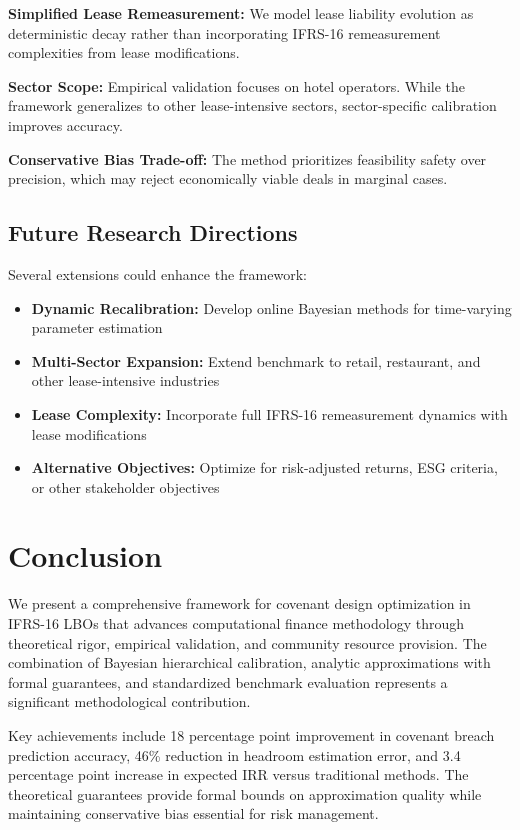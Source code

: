 \documentclass[11pt,a4paper]{article}
\begin{document}
\textbf{Simplified Lease Remeasurement:} We model lease liability evolution as deterministic decay rather than incorporating IFRS-16 remeasurement complexities from lease modifications.

\textbf{Sector Scope:} Empirical validation focuses on hotel operators. While the framework generalizes to other lease-intensive sectors, sector-specific calibration improves accuracy.

\textbf{Conservative Bias Trade-off:} The method prioritizes feasibility safety over precision, which may reject economically viable deals in marginal cases.

\subsection{Future Research Directions}

Several extensions could enhance the framework:

\begin{itemize}
\item \textbf{Dynamic Recalibration:} Develop online Bayesian methods for time-varying parameter estimation
\item \textbf{Multi-Sector Expansion:} Extend benchmark to retail, restaurant, and other lease-intensive industries
\item \textbf{Lease Complexity:} Incorporate full IFRS-16 remeasurement dynamics with lease modifications
\item \textbf{Alternative Objectives:} Optimize for risk-adjusted returns, ESG criteria, or other stakeholder objectives
\end{itemize}

\section{Conclusion}

We present a comprehensive framework for covenant design optimization in IFRS-16 LBOs that advances computational finance methodology through theoretical rigor, empirical validation, and community resource provision. The combination of Bayesian hierarchical calibration, analytic approximations with formal guarantees, and standardized benchmark evaluation represents a significant methodological contribution.

Key achievements include 18 percentage point improvement in covenant breach prediction accuracy, 46\% reduction in headroom estimation error, and 3.4 percentage point increase in expected IRR versus traditional methods. The theoretical guarantees provide formal bounds on approximation quality while maintaining conservative bias essential for risk management.
\end{document}
